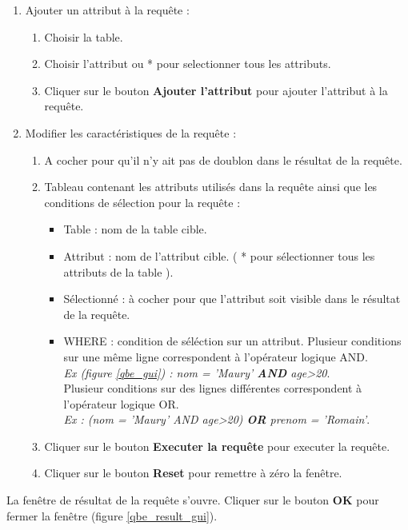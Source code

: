 \begin{enumerate}
\item Ajouter un attribut à la requête :
\begin{enumerate}
\item Choisir la table.
\item Choisir l'attribut ou * pour selectionner tous les attributs.
\item Cliquer sur le bouton \textbf{Ajouter l'attribut} pour ajouter l'attribut à la requête.
\end{enumerate}
\item Modifier les caractéristiques de la requête :
\begin{enumerate}
\item A cocher pour qu'il n'y ait pas de doublon dans le résultat de la requête.
\item Tableau contenant les attributs utilisés dans la requête ainsi que les conditions de sélection pour la requête :
\begin{itemize}
\item Table : nom de la table cible.
\item Attribut : nom de l'attribut cible. ( * pour sélectionner tous les attributs de la table ).
\item Sélectionné : à cocher pour que l'attribut soit visible dans le résultat de la requête.
\item WHERE : condition de séléction sur un attribut. 
Plusieur conditions sur une même ligne correspondent à l'opérateur logique AND. \\
\textit{Ex (figure \ref{qbe_gui}) : nom = 'Maury' \textbf{AND} age>20}.\\
Plusieur conditions sur des lignes différentes correspondent à l'opérateur logique OR.\\
 \textit{Ex : (nom = 'Maury' AND age>20) \textbf{OR} prenom = 'Romain'}.\\
\end{itemize}
\item Cliquer sur le bouton \textbf{Executer la requête} pour executer la requête.
\item Cliquer sur le bouton \textbf{Reset} pour remettre à zéro la fenêtre.
\end{enumerate}
\end{enumerate}

La fenêtre de résultat de la requête s'ouvre. Cliquer sur le bouton \textbf{OK} pour fermer la fenêtre (figure \ref{qbe_result_gui}).

